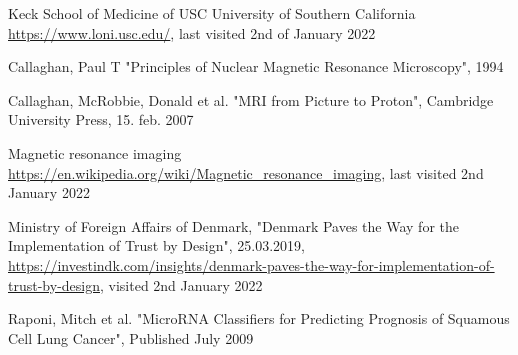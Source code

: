 \documentclass[12pt, fleqn, titlepage]{article}
\begin{document}
\begin{thebibliography}{9}
		 Keck School of Medicine of USC University of Southern California \url{https://www.loni.usc.edu/}, last visited 2nd of January 2022
		
		 Callaghan, Paul T "Principles of Nuclear
		Magnetic Resonance Microscopy", 1994
		
		 Callaghan, McRobbie, Donald et al. "MRI from Picture to Proton", Cambridge University Press, 15. feb. 2007
		
		 Magnetic resonance imaging \url{https://en.wikipedia.org/wiki/Magnetic_resonance_imaging}, last visited 2nd January 2022
		
		 Ministry of Foreign Affairs of Denmark, "Denmark Paves the Way for the Implementation of Trust by Design", 25.03.2019, \url{https://investindk.com/insights/denmark-paves-the-way-for-implementation-of-trust-by-design}, visited 2nd January 2022
		
		 Raponi, Mitch et al. "MicroRNA Classifiers for Predicting Prognosis of Squamous Cell Lung Cancer", Published July 2009
		
		
	\end{thebibliography}
	
	
	\newpage
	
	
	
	
	
	
\end{document}
